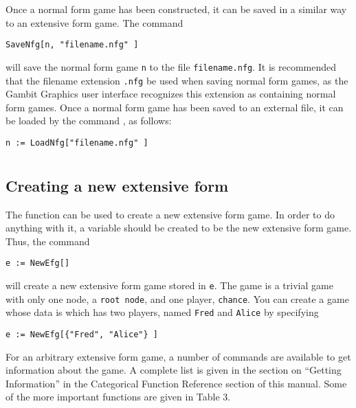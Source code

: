 Once a normal form game has been constructed, it can be saved in a
similar way to an extensive form game.  The command 

\begin{verbatim}
SaveNfg[n, "filename.nfg" ]
\end{verbatim}

\noindent
will save the normal form game \verb+n+ to the file
\verb+filename.nfg+.  It is recommended that the filename extension
\verb+.nfg+ be used when saving normal form games, as the Gambit
Graphics user interface recognizes this extension as containing normal
form games.  Once a normal form game has been saved to an external
file, it can be loaded by the command , as follows:

\begin{verbatim}
n := LoadNfg["filename.nfg" ]
\end{verbatim}



\section{}

\subsection{Creating a new extensive form}

The function  can be used to create a new extensive form
game.  In order to do anything with it, a variable should be created
to be the new extensive form game.  Thus, the command

\begin{verbatim}
e := NewEfg[]
\end{verbatim}

\noindent will create a new extensive form game stored in \verb+e+.
The game is a trivial game with only one node, a \verb+root node+, and
one player, \verb+chance+.  You can create a game whose data is which
has two players, named \verb+Fred+ and \verb+Alice+ by specifying


\begin{verbatim}
e := NewEfg[{"Fred", "Alice"} ]
\end{verbatim}

For an arbitrary extensive form game, a number of commands are
available to get information about the game.  A complete list is given
in the section on ``Getting Information'' in the Categorical Function
Reference section of this manual.  Some of the more important
functions are given in Table 3.  

